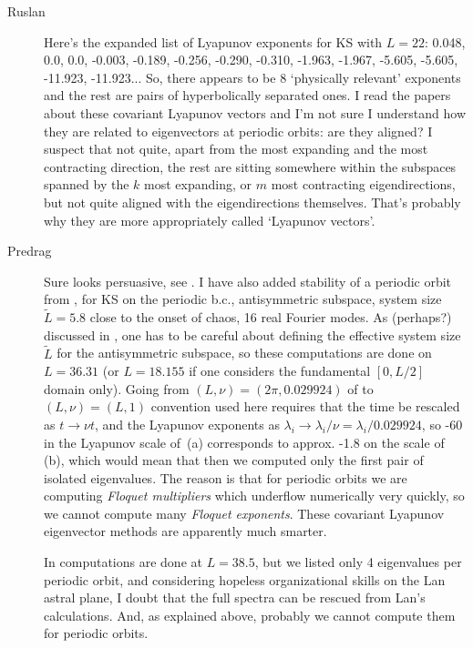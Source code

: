 \begin{description}
\item[Ruslan]
 Here's the expanded list of Lyapunov exponents for KS with $L = 22$:
 0.048,    0.0,    0.0,   -0.003,   -0.189,   -0.256,   -0.290,   -0.310,
-1.963,   -1.967,   -5.605,   -5.605,  -11.923,  -11.923...
So, there appears to be 8 `physically relevant' exponents and
the rest are pairs of hyperbolically separated ones.  I read
the papers about these covariant Lyapunov vectors and I'm not
sure I understand how they are related to eigenvectors at
periodic orbits: are they aligned?  I suspect that not quite,
apart from the most expanding and the most contracting
direction, the rest are sitting somewhere within the
subspaces spanned by the $k$ most expanding, or $m$ most
contracting eigendirections, but not quite aligned with the
eigendirections themselves.  That's probably why they are
more appropriately called `Lyapunov vectors'.

\item[Predrag]
Sure looks persuasive, see . I have also
added stability of a periodic orbit from
, for KS on the periodic b.c.,
antisymmetric subspace, system size $\tilde{L} = 5.8$ close
to the onset of chaos, 16 real Fourier modes. As (perhaps?)
discussed in , one has to be careful about
defining the effective system size $\tilde{L}$ for the
antisymmetric subspace, so these computations are done on
$L=36.31$ (or $L = 18.155$ if one considers the fundamental
$[0,L/2]$ domain only). Going from $(L,\nu) =
(2\pi,0.029924)$ of  to $(L,\nu) =
(L,1)$ convention used here requires that the time be
rescaled as $t \to \nu t$, and the Lyapunov exponents as
$\lambda_i \to \lambda_i/ \nu = \lambda_i/ 0.029924 $, so -60
in the Lyapunov scale of \,(a)
corresponds to approx. -1.8 on the scale of
\,(b), which would mean that then we
computed only the first pair of isolated eigenvalues. The
reason is that for periodic orbits we are computing {\em
Floquet multipliers} which underflow numerically very
quickly, so we cannot compute many {\em Floquet exponents}.
These covariant Lyapunov eigenvector methods are apparently
much smarter.

In  computations are done at $L = 38.5$,
but we listed only 4 eigenvalues per periodic orbit, and
considering hopeless organizational skills on the Lan astral
plane, I doubt that the full spectra can be rescued from
Lan's calculations. And, as explained above, probably we cannot
compute them for periodic orbits.


\end{description}
